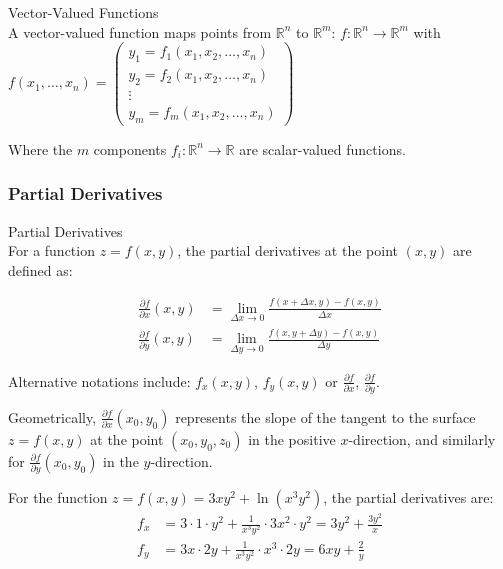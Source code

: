 \begin{definition}{Vector-Valued Functions}\\
A vector-valued function maps points from $\mathbb{R}^n$ to $\mathbb{R}^m$:
$f: \mathbb{R}^n \rightarrow \mathbb{R}^m$ with
$f(x_1, \ldots, x_n) = \begin{pmatrix} y_1 = f_1(x_1, x_2, \ldots, x_n) \\ y_2 = f_2(x_1, x_2, \ldots, x_n) \\ \vdots \\ y_m = f_m(x_1, x_2, \ldots, x_n) \end{pmatrix}$

Where the $m$ components $f_i: \mathbb{R}^n \rightarrow \mathbb{R}$ are scalar-valued functions.
\end{definition}

\subsubsection{Partial Derivatives}

\begin{definition}{Partial Derivatives}\\
For a function $z = f(x,y)$, the partial derivatives at the point $(x,y)$ are defined as:

\begin{align*}
\frac{\partial f}{\partial x}(x,y) &= \lim_{\Delta x \rightarrow 0} \frac{f(x+\Delta x, y) - f(x,y)}{\Delta x}\\
\frac{\partial f}{\partial y}(x,y) &= \lim_{\Delta y \rightarrow 0} \frac{f(x, y+\Delta y) - f(x,y)}{\Delta y}
\end{align*}

Alternative notations include: $f_x(x,y)$, $f_y(x,y)$ or $\frac{\partial f}{\partial x}$, $\frac{\partial f}{\partial y}$.

Geometrically, $\frac{\partial f}{\partial x}(x_0, y_0)$ represents the slope of the tangent to the surface $z=f(x,y)$ at the point $(x_0, y_0, z_0)$ in the positive $x$-direction, and similarly for $\frac{\partial f}{\partial y}(x_0, y_0)$ in the $y$-direction.
\end{definition}

\begin{example}
For the function $z = f(x,y) = 3xy^2 + \ln(x^3y^2)$, the partial derivatives are:
\begin{align*}
f_x &= 3 \cdot 1 \cdot y^2 + \frac{1}{x^3y^2} \cdot 3x^2 \cdot y^2 = 3y^2 + \frac{3y^2}{x}\\
f_y &= 3x \cdot 2y + \frac{1}{x^3y^2} \cdot x^3 \cdot 2y = 6xy + \frac{2}{y}
\end{align*}
\end{example}

